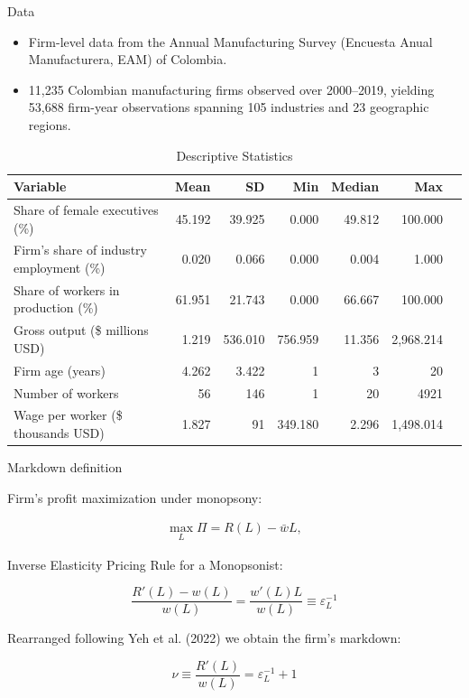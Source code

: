 \documentclass[11pt,aspectratio=169]{beamer}
\begin{document}
\begin{frame}{Data}

\begin{itemize}
  \item Firm-level data from the Annual Manufacturing Survey (Encuesta Anual Manufacturera, EAM) of Colombia.
  \item 11,235 Colombian manufacturing firms observed over 2000–2019, yielding 53,688 firm-year observations spanning 105 industries and 23 geographic regions.
\end{itemize}

\begin{table}
\centering
\footnotesize
\caption{Descriptive Statistics}
\label{tab:desc_stats}
\begin{tabular}{lrrrrrr}
\hline\hline
Variable & Mean & SD & Min & Median & Max \\
\hline
Share of female executives (\%) & 45.192 & 39.925 & 0.000 & 49.812 & 100.000 \\
Firm's share of industry employment (\%) & 0.020 & 0.066 & 0.000 & 0.004 & 1.000 \\
Share of workers in production (\%) & 61.951 & 21.743 & 0.000 & 66.667 & 100.000 \\
Gross output (\$ millions USD) & 1.219 & 536.010 & 756.959 & 11.356 & 2,968.214 \\
Firm age (years) & 4.262 & 3.422 & 1 & 3 & 20 \\
Number of workers & 56 & 146 & 1 & 20 & 4921 \\
Wage per worker (\$ thousands USD) & 1.827 & 91 & 349.180 & 2.296 & 1,498.014 \\
\hline\hline
\end{tabular}
\end{table}

\end{frame}

\begin{frame}{Markdown definition}

Firm's profit maximization under monopsony:

\begin{align}
\max_{L} \varPi = R(L) - \bar{w}L,
\end{align}

Inverse Elasticity Pricing Rule for a Monopsonist:

\begin{equation}
\frac{R'(L)-w(L)}{w(L)} = \frac{w'(L)L}{w(L)} \equiv \varepsilon_L^{-1}
\end{equation}

Rearranged following Yeh et al. (2022) we obtain the firm's markdown:

\begin{equation}
\nu \equiv \frac{R'(L)}{w(L)} = \varepsilon_L^{-1}+1
\end{equation}

\end{frame}
\end{document}

